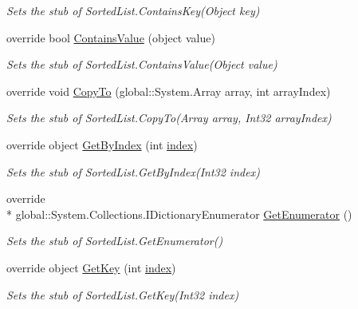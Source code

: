 \begin{DoxyCompactItemize}
\begin{DoxyCompactList}\small\item\em Sets the stub of Sorted\-List.\-Contains\-Key(\-Object key)\end{DoxyCompactList}\item 
override bool \hyperlink{class_system_1_1_collections_1_1_fakes_1_1_stub_sorted_list_ad768b580b2107ff888e9e76306d16b88}{Contains\-Value} (object value)
\begin{DoxyCompactList}\small\item\em Sets the stub of Sorted\-List.\-Contains\-Value(\-Object value)\end{DoxyCompactList}\item 
override void \hyperlink{class_system_1_1_collections_1_1_fakes_1_1_stub_sorted_list_a71115d5a16924cba4dd980520c5de449}{Copy\-To} (global\-::\-System.\-Array array, int array\-Index)
\begin{DoxyCompactList}\small\item\em Sets the stub of Sorted\-List.\-Copy\-To(\-Array array, Int32 array\-Index)\end{DoxyCompactList}\item 
override object \hyperlink{class_system_1_1_collections_1_1_fakes_1_1_stub_sorted_list_ae7fe4476c2c08495ca9898eccce6862d}{Get\-By\-Index} (int \hyperlink{jquery-1_810_82-vsdoc_8js_a75bb12d1f23302a9eea93a6d89d0193e}{index})
\begin{DoxyCompactList}\small\item\em Sets the stub of Sorted\-List.\-Get\-By\-Index(\-Int32 index)\end{DoxyCompactList}\item 
override \\*
global\-::\-System.\-Collections.\-I\-Dictionary\-Enumerator \hyperlink{class_system_1_1_collections_1_1_fakes_1_1_stub_sorted_list_a6debd90ed5a6566019dc24654fc29125}{Get\-Enumerator} ()
\begin{DoxyCompactList}\small\item\em Sets the stub of Sorted\-List.\-Get\-Enumerator()\end{DoxyCompactList}\item 
override object \hyperlink{class_system_1_1_collections_1_1_fakes_1_1_stub_sorted_list_a5ac4ccd0e0eff594c44a8d80444b7575}{Get\-Key} (int \hyperlink{jquery-1_810_82-vsdoc_8js_a75bb12d1f23302a9eea93a6d89d0193e}{index})
\begin{DoxyCompactList}\small\item\em Sets the stub of Sorted\-List.\-Get\-Key(\-Int32 index)\end{DoxyCompactList}\item 

\end{DoxyCompactItemize}
